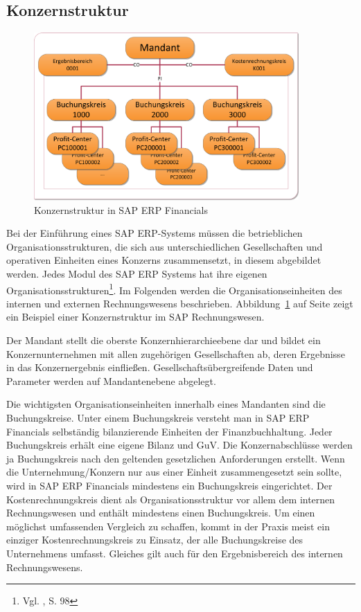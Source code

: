\subsection{Konzernstruktur}
\begin{figure}[htbp]
\begin{center}
\includegraphics[width=0.9\textwidth]{Images/konzernStruktur.png}

   \caption[Konzernstruktur in SAP ERP Financials]{Konzernstruktur in SAP ERP Financials}\label{abb2}
\end{center}
\end{figure}\noindent
Bei der Einführung eines SAP ERP-Systems müssen die betrieblichen Organisationsstrukturen, die sich aus unterschiedlichen Gesellschaften und operativen Einheiten eines Konzerns zusammensetzt, in diesem abgebildet werden.
Jedes Modul des SAP ERP Systems hat ihre eigenen Organisationsstrukturen\footnote{Vgl. \cite{Klein2010}, S. 98}. Im Folgenden werden die Organisationseinheiten des internen und externen Rechnungswesens beschrieben. Abbildung~\ref{abb2} auf Seite \pageref{abb2} zeigt ein Beispiel einer Konzernstruktur im SAP Rechnungswesen.

Der Mandant stellt die oberste Konzernhierarchieebene dar und bildet ein Konzernunternehmen mit allen zugehörigen Gesellschaften ab, deren Ergebnisse in das Konzernergebnis einfließen. Gesellschaftsübergreifende Daten und Parameter werden auf Mandantenebene abgelegt.

Die wichtigsten Organisationseinheiten innerhalb eines Mandanten sind die Buchungskreise. Unter einem Buchungskreis versteht man in SAP ERP Financials selbständig bilanzierende Einheiten der Finanzbuchhaltung. Jeder Buchungskreis erhält eine eigene Bilanz und GuV. Die Konzernabschlüsse werden ja Buchungskreis nach den geltenden gesetzlichen Anforderungen erstellt. Wenn die Unternehmung/Konzern nur aus einer Einheit zusammengesetzt sein sollte, wird in SAP ERP Financials mindestens ein Buchungskreis eingerichtet.
Der Kostenrechnungskreis dient als Organisationsstruktur vor allem dem internen Rechnungswesen und enthält mindestens einen Buchungskreis. Um einen möglichst umfassenden Vergleich zu schaffen, kommt in der Praxis meist ein einziger Kostenrechnungskreis zu Einsatz, der alle Buchungskreise des Unternehmens umfasst. Gleiches gilt auch für den Ergebnisbereich des internen Rechnungswesens.

